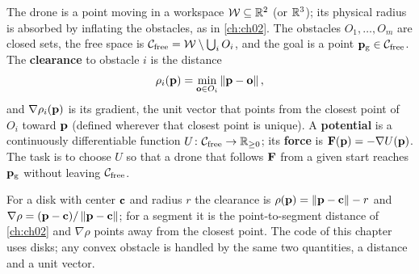 \begin{definition}
\label{def:ch15-problem}
The drone is a point moving in a workspace $\mathcal{W} \subseteq \mathbb{R}^2$ (or
$\mathbb{R}^3$); its physical radius is absorbed by inflating the obstacles, as in
\cref{ch:ch02}. The obstacles $O_1, \dots, O_m$ are closed sets, the free
space is $\mathcal{C}_{\mathrm{free}} = \mathcal{W} \setminus \bigcup_i O_i$, and the goal is a
point $\mathbf{p}_{\mathrm{g}} \in \mathcal{C}_{\mathrm{free}}$. The \textbf{clearance}
to obstacle $i$ is the distance
\begin{equation}
  \rho_i(\mathbf{p}) = \min_{\mathbf{o} \in O_i} \left\lVert \mathbf{p} - \mathbf{o} \right\rVert,
  \label{eq:ch15-clearance}
\end{equation}
and $\nabla \rho_i(\mathbf{p})$ is its gradient, the unit vector that points from
the closest point of $O_i$ toward $\mathbf{p}$ (defined wherever that closest
point is unique). A \textbf{potential} is a continuously
differentiable function $U \colon \mathcal{C}_{\mathrm{free}} \to \mathbb{R}_{\ge 0}$; its
\textbf{force} is $\mathbf{F}(\mathbf{p}) = -\nabla
U(\mathbf{p})$. The task is to choose $U$ so that a drone that follows $\mathbf{F}$
from a given start reaches $\mathbf{p}_{\mathrm{g}}$ without leaving $\mathcal{C}_{\mathrm{free}}$.
\end{definition}

For a disk with center $\mathbf{c}$ and radius $r$ the clearance is
$\rho(\mathbf{p}) = \left\lVert \mathbf{p} - \mathbf{c} \right\rVert - r$ and $\nabla\rho = (\mathbf{p} - \mathbf{c}) /
\left\lVert \mathbf{p} - \mathbf{c} \right\rVert$; for a segment it is the point-to-segment distance of
\cref{ch:ch02} and $\nabla\rho$ points away from the closest point. The code
of this chapter uses disks; any convex obstacle is handled by the same two
quantities, a distance and a unit vector.

